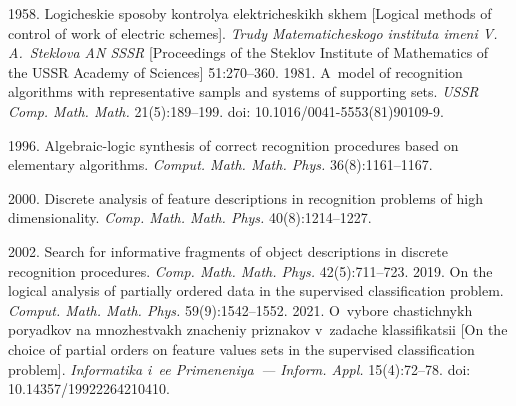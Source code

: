 



  


  \begin{multicols}{2}

\renewcommand{\bibname}{\protect\rmfamily References}

{\small\frenchspacing
 {%
 \begin{thebibliography}{99} 
 1958. Lo\-gi\-che\-skie spo\-so\-by kont\-ro\-lya  
elekt\-ri\-che\-skikh skhem [Logical methods of control of work of electric schemes]. 
\textit{Trudy Ma\-te\-ma\-ti\-che\-sko\-go instituta imeni V.\,A.~Steklova AN SSSR} [Proceedings of the 
Steklov Institute of Mathematics of the USSR Academy of Sciences] 51:270--360. 
 1981. A~model of recognition algorithms with 
representative sampls and systems of supporting sets. \textit{USSR Comp. Math. Math.} 
21(5):189--199. doi: 10.1016/0041-5553(81)90109-9.

 1996. Algebraic-logic synthesis of 
correct recognition procedures based on elementary algorithms. \textit{Comput. Math. Math. 
Phys.} 36(8):1161--1167.

 2000. Discrete analysis of feature descriptions in 
recognition problems of high dimensionality. \textit{Comp. Math. Math. Phys.} 
40(8):1214--1227.

 2002. Search for informative fragments of object descriptions 
in discrete recognition procedures. \textit{Comp. Math. Math. Phys.} 42(5):711--723.
 2019. On the logical analysis of 
partially ordered data in the supervised classification problem. \textit{Comput. Math. Math. 
Phys.} 59(9):1542--1552.
 2021. O~vy\-bo\-re chas\-tic\-hnykh po\-ryad\-kov 
na mno\-zhest\-vakh zna\-che\-niy priz\-na\-kov v~za\-da\-che klas\-si\-fi\-ka\-tsii [On the choice 
of partial orders on feature values sets in the supervised classification problem]. 
\textit{Informatika i~ee Primeneniya~--- Inform. Appl.} 15(4):72--78. doi: 
10.14357/19922264210410.


\end{thebibliography}}}
\end{multicols}

